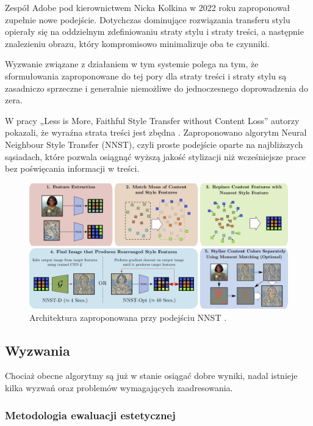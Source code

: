\documentclass[12pt]{article}
\begin{document}
\indent

Zespół Adobe pod kierownictwem Nicka Kolkina w 2022 roku zaproponował zupełnie nowe podejście. Dotychczas dominujące rozwiązania transferu stylu opierały się na oddzielnym zdefiniowaniu straty stylu i straty treści, a następnie znalezieniu obrazu, który kompromisowo minimalizuje oba te czynniki.

Wyzwanie związane z działaniem w tym systemie polega na tym, że sformułowania zaproponowane do tej pory dla straty treści i straty stylu są zasadniczo sprzeczne i generalnie niemożliwe do jednoczesnego doprowadzenia do zera.

W pracy „Less is More, Faithful Style Transfer without Content Loss” autorzy pokazali, że wyraźna strata treści jest zbędna \cite{31}. Zaproponowano algorytm Neural Neighbour Style Transfer (NNST), czyli proste podejście oparte na najbliższych sąsiadach, które pozwala osiągnąć wyższą jakość stylizacji niż wcześniejsze prace bez poświęcania informacji w treści.

\begin{figure}[H]
    \centering
    \includegraphics[width=\textwidth]{u10.png}
    \caption{Architektura zaproponowana przy podejściu NNST \cite{31}.}
    \label{fig:7}
\end{figure}

\subsection{Wyzwania}

\indent

Chociaż obecne algorytmy są już w stanie osiągać dobre wyniki, nadal istnieje kilka wyzwań oraz problemów wymagających zaadresowania.

\subsubsection{Metodologia ewaluacji estetycznej}
\end{document}

